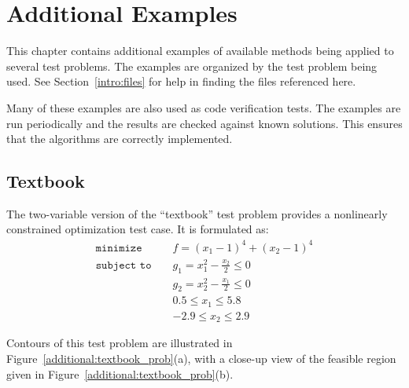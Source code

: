 \chapter{Additional Examples}\label{additional}

This chapter contains additional examples of available methods being applied
to several test problems. The examples are organized by the test problem
being used. See Section~\ref{intro:files} for help in finding the files referenced
here.

Many of these examples are also used as code verification tests. The examples are
run periodically and the results are checked against known solutions. This
ensures that the algorithms are correctly implemented.

\section{Textbook}\label{additional:textbook}

The two-variable version of the ``textbook'' test problem provides
a nonlinearly constrained optimization test case. It is formulated as:
\begin{eqnarray}
\texttt{minimize }
& & f = (x_1-1)^{4}+(x_2-1)^{4}     \nonumber \\
\texttt{subject to }
& & g_1 = x_1^2-\frac{x_2}{2} \le 0 \nonumber \\
& & g_2 = x_2^2-\frac{x_1}{2} \le 0 \label{additional:textbook_f} \\
& &  0.5 \le x_1 \le 5.8            \nonumber \\
& & -2.9 \le x_2 \le 2.9            \nonumber
\end{eqnarray}

Contours of this test problem are illustrated in
Figure~\ref{additional:textbook_prob}(a), with a close-up view of
the feasible region given in
Figure~\ref{additional:textbook_prob}(b).

